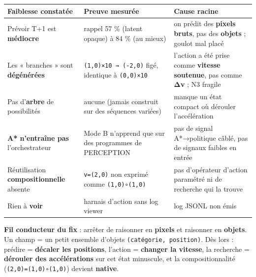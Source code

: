 \documentclass[
  french,
  11pt,
]{article}
\newcounter{none} %
\begin{document}
{\def\LTcaptype{none} %
\begin{longtable}[]{@{}
  >{\raggedright\arraybackslash}p{}
  >{\raggedright\arraybackslash}p{}
  >{\raggedright\arraybackslash}p{}@{}}
\toprule\noalign{}
\begin{minipage}[b]{\linewidth}\raggedright
Faiblesse constatée
\end{minipage} & \begin{minipage}[b]{\linewidth}\raggedright
Preuve mesurée
\end{minipage} & \begin{minipage}[b]{\linewidth}\raggedright
Cause racine
\end{minipage} \\
\midrule\noalign{}
\endhead
\bottomrule\noalign{}
\endlastfoot
Prévoir T+1 est \textbf{médiocre} & rappel 57 \% (latent opaque) à 84 \%
(au mieux) & on prédit des \textbf{pixels bruts}, pas des
\textbf{objets} ; goulot mal placé \\
Les « branches » sont \textbf{dégénérées} & \texttt{(1,0)×10\ →\ (‑2,0)}
figé, identique à \texttt{(0,0)×10} & l'action a été prise comme
\textbf{vitesse soutenue}, pas comme \textbf{Δv} ; N3 fragile \\
Pas d'\textbf{arbre} de possibilités & aucune (jamais construit sur des
séquences variées) & manque un état compact où dérouler
l'accélération \\
\textbf{A* n'entraîne pas} l'orchestrateur & Mode B n'apprend que sur
des programmes de PERCEPTION & pas de signal A*→politique câblé, pas de
signaux faibles en entrée \\
Réutilisation \textbf{compositionnelle} absente & \texttt{v=(2,0)} non
exprimé comme \texttt{(1,0)∘(1,0)} & pas d'opérateur d'action paramétré
ni de recherche qui la trouve \\
Rien à \textbf{voir} & harnais d'action sans log viewer & log JSONL non
émis \\
\end{longtable}
}

\textbf{Fil conducteur du fix} : arrêter de raisonner en \textbf{pixels}
et raisonner en \textbf{objets}. Un champ = un petit ensemble d'objets
\texttt{(catégorie,\ position)}. Dès lors : prédire = \textbf{décaler
les positions}, l'action = \textbf{changer la vitesse}, la recherche =
\textbf{dérouler des accélérations} sur cet état minuscule, et la
compositionnalité (\texttt{(2,0)=(1,0)∘(1,0)}) devient \textbf{native}.
\end{document}
